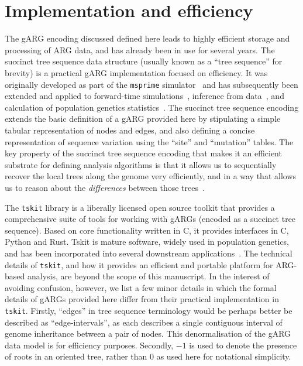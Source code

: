 \documentclass{article}
\begin{document}
\section{Implementation and efficiency}
\label{sec-efficiency}
The gARG encoding discussed defined here
leads to highly efficient storage and processing of ARG data,
and has already been in use for several years.
The succinct tree sequence data structure
(usually known as a ``tree sequence'' for brevity)
is a practical gARG implementation focused on efficiency.
It was originally developed as part of the \texttt{msprime}
simulator~\citep{kelleher2016efficient} and has subsequently been
extended and applied to forward-time
simulations~\citep{kelleher2018efficient,haller2018tree},
inference from data~\citep{kelleher2019inferring,wohns2022unified},
and calculation of population genetics statistics~\citep{ralph2020efficiently}.
The succinct tree sequence encoding extends the basic definition
of a gARG provided here by stipulating a
simple tabular representation of nodes and edges,
and also defining a concise representation of
sequence variation using the ``site'' and  ``mutation'' tables.
The key property of the succinct tree sequence encoding
that makes it an efficient substrate for defining analysis
algorithms is that it allows us to sequentially
recover the local trees along the genome very efficiently,
and in a way that allows us to reason about the \emph{differences}
between those trees~\citep{kelleher2016efficient,ralph2020efficiently}.

The \texttt{tskit} library is a liberally
licensed open source toolkit that provides a comprehensive suite
of tools for working with gARGs (encoded as a succinct tree sequence).
Based on core functionality written
in C, it provides interfaces in C, Python and Rust.
Tskit is mature software, widely used in population genetics, and
has been incorporated into several downstream
applications~\citep[e.g.,][]{haller2019slim,speidel2019method,
adrion2020community,
terasaki2021geonomics,
baumdicker2021efficient,
fan2022genealogical,
guo2022recombination,
korfmann2022weak,
mahmoudi2022bayesian,
petr2022slendr,
rasmussen2022espalier,
zhang2023biobank,
nowbandegani2023extremely,
ignatieva2023distribution,
fan2023likelihood}.
The technical details of \texttt{tskit}, and how it provides an
efficient and portable platform for ARG-based analysis, are beyond
the scope of this manuscript.
In the interest of avoiding confusion, however, we list a
few minor details in which the formal details of gARGs
provided here differ from their practical implementation in
\texttt{tskit}.
Firstly, ``edges'' in tree sequence terminology would be perhaps better be
described as ``edge-intervals'', as each describes a single contiguous
interval of genome inheritance between a pair of nodes.
This denormalisation of the gARG data model is for efficiency purposes.
Secondly, $-1$ is used to denote the presence of
roots in an oriented tree, rather than $0$ as used here for notational
simplicity.
\end{document}
